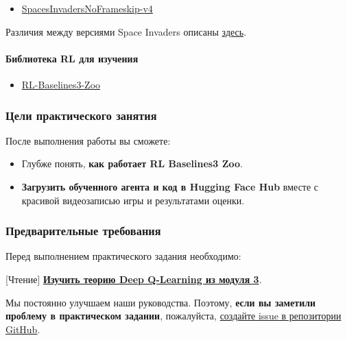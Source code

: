 \documentclass[11pt,a4paper]{article}
\begin{document}
\begin{itemize}
\tightlist
\item
\href{https://gymnasium.farama.org/environments/atari/space_invaders/}{SpacesInvadersNoFrameskip-v4}
\end{itemize}

Различия между версиями Space Invaders описаны \href{https://gymnasium.farama.org/environments/atari/space_invaders/#variants}{здесь}.

\paragraph{Библиотека RL для изучения}\label{reading-rl-library}

\begin{itemize}
\tightlist
\item
\href{https://github.com/DLR-RM/rl-baselines3-zoo}{RL-Baselines3-Zoo}
\end{itemize}

\subsubsection{Цели практического занятия}\label{objectives-of-this-hands-on}

После выполнения работы вы сможете:

\begin{itemize}
\tightlist
\item
Глубже понять, \textbf{как работает RL Baselines3 Zoo}.
\item
\textbf{Загрузить обученного агента и код в Hugging Face Hub} вместе с красивой видеозаписью игры и результатами оценки.
\end{itemize}

\subsubsection{Предварительные требования}\label{prerequisites}

Перед выполнением практического задания необходимо:

[Чтение] \textbf{\href{https://huggingface.co/deep-rl-course/unit3/introduction}{Изучить теорию Deep Q-Learning из модуля 3}}.

Мы постоянно улучшаем наши руководства. Поэтому, \textbf{если вы заметили проблему в практическом задании}, пожалуйста, \href{https://github.com/huggingface/deep-rl-class/issues}{создайте issue в репозитории GitHub}.
\end{document}
